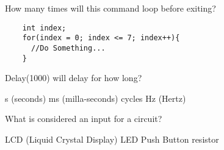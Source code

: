 \documentclass{exam}
\begin{document}
\begin{questions}
  \question How many times will this command loop before exiting?
  \begin{verbatim}
    int index;
    for(index = 0; index <= 7; index++){
      //Do Something...
    }
  \end{verbatim}
    \begin{choices}
    \end{choices}
  
  \question Delay(1000) will delay for how long?
    \begin{choices}
       s (seconds) 
       ms (milla-seconds)
       cycles
       Hz (Hertz)
    \end{choices}

  \question What is considered an input for a circuit? 
    \begin{choices}
      \choice LCD (Liquid Crystal Display)
      \choice LED
      \choice Push Button
      \choice resistor
    \end{choices}
  
  \end{questions}
\end{document}
